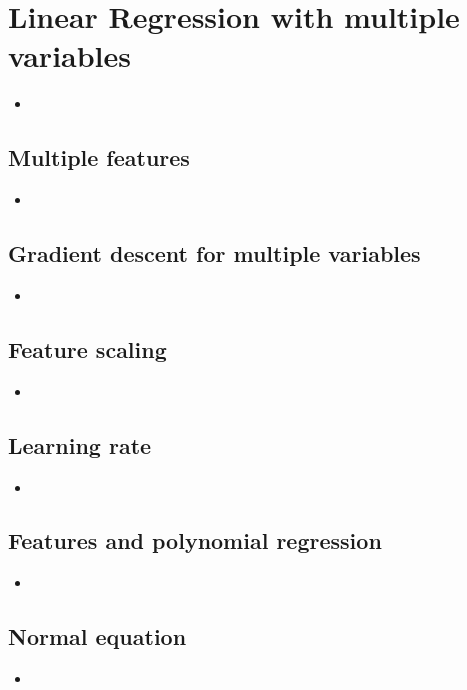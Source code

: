\documentclass[13pt]{book}
\begin{document}
\chapter{Linear Regression with multiple variables}
\begin{itemize}
  \item
\end{itemize}

\section{Multiple features}
\begin{itemize}
  \item
\end{itemize}

\section{Gradient descent for multiple variables}
\begin{itemize}
  \item
\end{itemize}

\section{Feature scaling}
\begin{itemize}
  \item
\end{itemize}

\section{Learning rate}
\begin{itemize}
  \item
\end{itemize}

\section{Features and polynomial regression}
\begin{itemize}
  \item
\end{itemize}

\section{Normal equation}
\begin{itemize}
  \item
\end{itemize}
\end{document}
